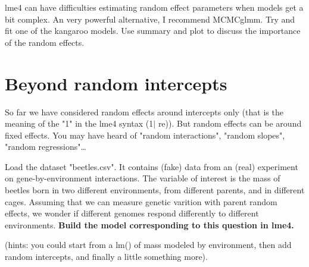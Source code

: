 \documentclass[12pt,a4paper]{scrartcl}\usepackage[]{graphicx}\usepackage[]{color}
\makeatletter
\newcommand{\hlnum}[1]{\textcolor[rgb]{0.686,0.059,0.569}{#1}}%
\newcommand{\hlstr}[1]{\textcolor[rgb]{0.192,0.494,0.8}{#1}}%
\newcommand{\hlopt}[1]{\textcolor[rgb]{0,0,0}{#1}}%
\newcommand{\hlstd}[1]{\textcolor[rgb]{0.345,0.345,0.345}{#1}}%
\newcommand{\hlkwb}[1]{\textcolor[rgb]{0.69,0.353,0.396}{#1}}%
\newcommand{\hlkwc}[1]{\textcolor[rgb]{0.333,0.667,0.333}{#1}}%
\newcommand{\hlkwd}[1]{\textcolor[rgb]{0.737,0.353,0.396}{\textbf{#1}}}%
\newenvironment{kframe}{%
 \def\at@end@of@kframe{}%
 \ifinner\ifhmode%
  \def\at@end@of@kframe{\end{minipage}}%
  \begin{minipage}{\columnwidth}%
 \fi\fi%
 \def\FrameCommand##1{\hskip\@totalleftmargin \hskip-\fboxsep
 \colorbox{shadecolor}{##1}\hskip-\fboxsep
     \hskip-\linewidth \hskip-\@totalleftmargin \hskip\columnwidth}%
 \MakeFramed {\advance\hsize-\width
   \@totalleftmargin\z@ \linewidth\hsize
   \@setminipage}}%
 {\par\unskip\endMakeFramed%
 \at@end@of@kframe}
\newenvironment{knitrout}{}{} %
\makeatother
\begin{document}
\begin{Exercise}[difficulty=2, title={Testing variance components in MCMCglmm}]
lme4 can have difficulties estimating random effect parameters when models get a bit complex. An very powerful alternative, I recommend MCMCglmm. Try and fit one of the kangaroo models. Use summary and plot to discuss the importance of the random effects.
\end{Exercise}


\section{Beyond random intercepts}

So far we have considered random effects around intercepts only (that is the meaning of the "1" in the lme4 syntax (1$\mid$ re)). But random effects can be around fixed effects. You may have heard of "random interactions", "random slopes", "random regressions"\dots





\begin{Exercise}[difficulty=2, title={Beetles: build a model}]
Load the dataset "beetles.csv". It contains (fake) data from an (real) experiment on gene-by-environment interactions. The variable of interest is the mass of beetles born in two different environments, from different parents, and in different cages. Assuming that we can measure genetic varition with parent random effects, we wonder if different genomes respond differently to different environments.
\textbf{Build the model corresponding to this question in lme4.}

(hints: you could start from a lm() of mass modeled by environment, then add random intercepts, and finally a little something more).
\end{Exercise}
\end{document}
